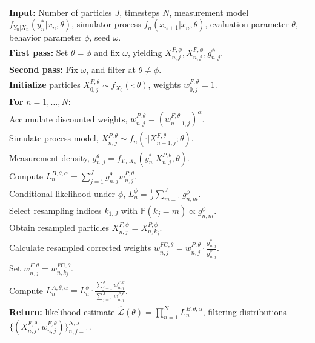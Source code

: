 \documentclass[11pt]{report}
\begin{document}
\begin{tabular}{@{}p{}@{}}
\textbf{Input:} Number of particles $J$, timesteps $N$, measurement model $f_{Y_n|X_n}(y_n^*|x_n, \theta)$, simulator process $f_n(x_{n+1}|x_n, \theta)$, evaluation parameter $\theta$, behavior parameter $\phi$, seed $\omega$. \\[0.5em]

\textbf{First pass:} Set $\theta = \phi$ and fix $\omega$, yielding $X_{n,j}^{P,\phi}, X_{n,j}^{F,\phi}, g_{n,j}^\phi$. \\

\textbf{Second pass:} Fix $\omega$, and filter at $\theta \neq \phi$. \\

\textbf{Initialize} particles $X_{0,j}^{F,\theta} \sim f_{X_0}(\cdot; \theta)$, weights $w_{0,j}^{F,\theta} = 1$. \\

\textbf{For} $n = 1, \ldots, N$: \\[0.25em]
\quad Accumulate discounted weights, $w_{n,j}^{P,\theta} = (w_{n-1,j}^{F,\theta})^\alpha$. \\
\quad Simulate process model, $X_{n,j}^{P,\theta} \sim f_n(\cdot | X_{n-1,j}^{F,\theta}; \theta)$. \\
\quad Measurement density, $g_{n,j}^\theta = f_{Y_n|X_n}(y_n^* | X_{n,j}^{P,\theta}, \theta)$. \\
\quad Compute $L_n^{B,\theta,\alpha} = \sum_{j=1}^J g_{n,j}^\theta w_{n,j}^{P,\theta}$. \\
\quad Conditional likelihood under $\phi$, $L_n^\phi = \frac{1}{J} \sum_{m=1}^J g_{n,m}^\phi$. \\
\quad Select resampling indices $k_{1:J}$ with $\mathbb{P}(k_j = m) \propto g_{n,m}^\phi$. \\
\quad Obtain resampled particles $X_{n,j}^{F,\phi} = X_{n,k_j}^{P,\phi}$. \\
\quad Calculate resampled corrected weights $w_{n,j}^{FC,\theta} = w_{n,j}^{P,\theta} \cdot \frac{g_{n,j}^\theta}{g_{n,j}^\phi}$. \\
\quad Set $w_{n,j}^{F,\theta} = w_{n,k_j}^{FC,\theta}$. \\
\quad Compute $L_n^{A,\theta,\alpha} = L_n^\phi \cdot \frac{\sum_{j=1}^J w_{n,j}^{F,\theta}}{\sum_{j=1}^J w_{n,j}^{P,\theta}}$. \\[0.25em]

\textbf{Return:} likelihood estimate $\hat{\mathcal{L}}(\theta) = \prod_{n=1}^N L_n^{B,\theta,\alpha}$, filtering distributions $\{(X_{n,j}^{F,\theta}, w_{n,j}^{F,\theta})\}_{n,j=1}^{N,J}$.
\end{tabular}
\bigskip



\newpage
{}
\printindex
\end{document}
